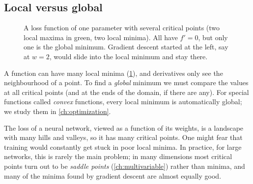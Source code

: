 \subsection{Local versus global}

\begin{figure}[htbp]
\centering
{}
\caption{A loss function of one parameter with several critical points (two
  local maxima in green, two local minima). All have $f' = 0$, but only one is
  the global minimum. Gradient descent started at the left, say at $w = 2$,
  would slide into the local minimum and stay there.}
\label{fig:local-global}
\end{figure}

A function can have many local minima (\cref{fig:local-global}), and
derivatives only see the neighbourhood of a point. To find a \emph{global}
minimum we must compare the values at all critical points (and at the ends of
the domain, if there are any). For special functions called \emph{convex}
functions, every local minimum is automatically global; we study them in
\cref{ch:optimization}.

\begin{mlnote}
The loss of a neural network, viewed as a function of its weights, is a
landscape with many hills and valleys, so it has many critical points. One
might fear that training would constantly get stuck in poor local minima. In
practice, for large networks, this is rarely the main problem; in many
dimensions most critical points turn out to be \emph{saddle points}
(\cref{ch:multivariable}) rather than minima, and many of the minima found by
gradient descent are almost equally good.
\end{mlnote}

